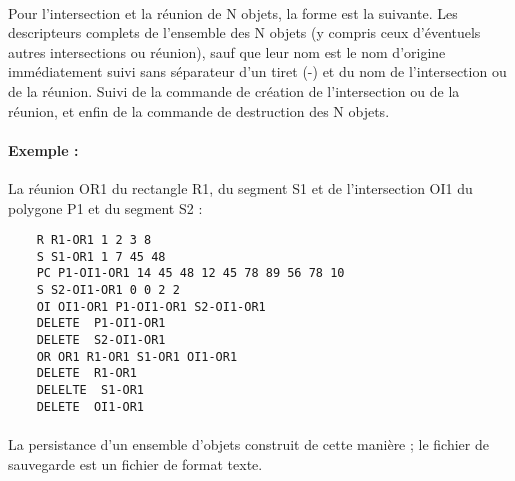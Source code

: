 \paragraph{}
Pour l'intersection et la réunion de N objets, la forme est la suivante. Les descripteurs complets de l'ensemble des N objets (y compris ceux d'éventuels autres intersections ou réunion), sauf que leur nom est le nom d'origine immédiatement suivi sans séparateur d'un tiret (-) et du nom de l'intersection ou de la réunion. Suivi de la commande de création de l'intersection ou de la réunion, et enfin de la commande de destruction des N objets.
\paragraph{Exemple :}
La réunion OR1 du rectangle R1, du segment S1 et de l'intersection OI1 du polygone P1 et du segment S2 :
\begin{lstlisting}
	R R1-OR1 1 2 3 8
	S S1-OR1 1 7 45 48
	PC P1-OI1-OR1 14 45 48 12 45 78 89 56 78 10
	S S2-OI1-OR1 0 0 2 2
	OI OI1-OR1 P1-OI1-OR1 S2-OI1-OR1  
	DELETE  P1-OI1-OR1
	DELETE  S2-OI1-OR1
	OR OR1 R1-OR1 S1-OR1 OI1-OR1
	DELETE  R1-OR1
	DELELTE  S1-OR1
	DELETE  OI1-OR1
\end{lstlisting}
\paragraph{}
La persistance d'un ensemble d'objets construit de cette manière ; le fichier
de sauvegarde est un fichier de format texte.














